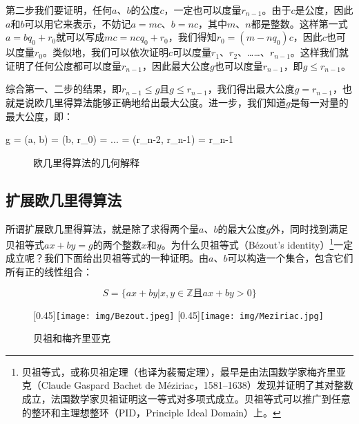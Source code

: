 \documentclass[b5paper]{ctexart}
\begin{document}
第二步我们要证明，任何$a$、$b$的公度$c$，一定也可以度量$r_{n-1}$。由于$c$是公度，因此$a$和$b$可以用它来表示，不妨记$a = mc$、$b = nc$，其中$m$、$n$都是整数。这样第一式$a = b q_0 + r_0$就可以写成$mc = ncq_0 + r_0$，我们得知$r_0 = (m - nq_0)c$，因此$c$也可以度量$r_0$。类似地，我们可以依次证明$c$可以度量$r_1$、$r_2$、……、$r_{n-1}$。这样我们就证明了任何公度都可以度量$r_{n-1}$，因此最大公度$g$也可以度量$r_{n-1}$，即$g \leq r_{n-1}$。

综合第一、二步的结果，即$r_{n-1} \leq g$且$g \leq r_{n-1}$，我们得出最大公度$g = r_{n-1}$，也就是说欧几里得算法能够正确地给出最大公度。进一步，我们知道$g$是每一对量的最大公度，即：

\be
g = \gcm(a, b) = \gcm(b, r_0) = ... = \gcm(r_{n-2}, r_{n-1}) = r_{n-1}
\label{eq:recursive-gcm}
\ee

\begin{figure}[htbp]
 \centering
 \caption{欧几里得算法的几何解释}
 \label{fig:geometric-GCM}
\end{figure}

\subsection{扩展欧几里得算法}

 
所谓扩展欧几里得算法，就是除了求得两个量$a$、$b$的最大公度$g$外，同时找到满足贝祖等式$ax + by = g$的两个整数$x$和$y$。为什么贝祖等式（Bézout's identity）\footnote{贝祖等式，或称贝祖定理（也译为裴蜀定理），最早是由法国数学家梅齐里亚克（Claude Gaspard Bachet de Méziriac，1581–1638）发现并证明了其对整数成立，法国数学家贝祖证明这一等式对多项式成立。贝祖等式可以推广到任意的整环和主理想整环（PID，Principle Ideal Domain）上。}一定成立呢？我们下面给出贝祖等式的一种证明。由$a$、$b$可以构造一个集合，包含它们所有正的线性组合：

\[
S = \{ ax + by | x, y \in \mathbb{Z} \text{且} ax + by > 0\}
\]

\begin{figure}[htbp]
 \centering
 [0.45\linewidth]{\texttt{[image: img/Bezout.jpeg]}}
 [0.45\linewidth]{\texttt{[image: img/Meziriac.jpg]}}
 \caption{贝祖和梅齐里亚克}
 \label{fig:Bezout}
 \label{fig:Meziriac}
\end{figure}
\end{document}
